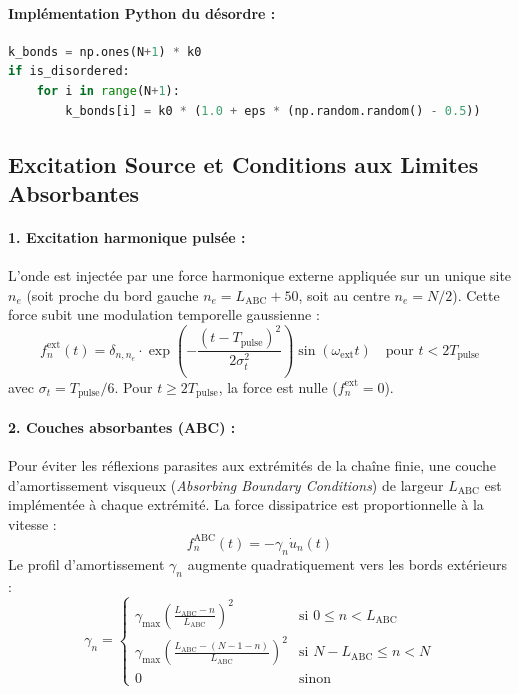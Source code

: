 \documentclass[11pt, a4paper]{report}
\begin{document}
\paragraph{Implémentation Python du désordre :}
\begin{lstlisting}[language=Python]
k_bonds = np.ones(N+1) * k0
if is_disordered:
    for i in range(N+1):
        k_bonds[i] = k0 * (1.0 + eps * (np.random.random() - 0.5))
\end{lstlisting}

\subsection{Excitation Source et Conditions aux Limites Absorbantes}

\paragraph{1. Excitation harmonique pulsée :}
L'onde est injectée par une force harmonique externe appliquée sur un unique site $n_e$ (soit proche du bord gauche $n_e = L_{\text{ABC}} + 50$, soit au centre $n_e = N/2$). Cette force subit une modulation temporelle gaussienne :
\begin{equation}
    f_n^{\text{ext}}(t) = \delta_{n, n_e} \cdot \exp\left(-\frac{(t - T_{\text{pulse}})^2}{2 \sigma_t^2}\right) \sin(\omega_{\text{ext}} t) \quad \text{pour } t < 2 T_{\text{pulse}}
\end{equation}
avec $\sigma_t = T_{\text{pulse}} / 6$. Pour $t \ge 2 T_{\text{pulse}}$, la force est nulle ($f_n^{\text{ext}} = 0$).

\paragraph{2. Couches absorbantes (ABC) :}
Pour éviter les réflexions parasites aux extrémités de la chaîne finie, une couche d'amortissement visqueux (\textit{Absorbing Boundary Conditions}) de largeur $L_{\text{ABC}}$ est implémentée à chaque extrémité. La force dissipatrice est proportionnelle à la vitesse :
\begin{equation}
    f_n^{\text{ABC}}(t) = -\gamma_n \dot{u}_n(t)
\end{equation}
Le profil d'amortissement $\gamma_n$ augmente quadratiquement vers les bords extérieurs :
\begin{equation}
    \gamma_n = \begin{cases}
        \gamma_{\text{max}} \left(\frac{L_{\text{ABC}} - n}{L_{\text{ABC}}}\right)^2 & \text{si } 0 \le n < L_{\text{ABC}} \\
        \gamma_{\text{max}} \left(\frac{L_{\text{ABC}} - (N - 1 - n)}{L_{\text{ABC}}}\right)^2 & \text{si } N - L_{\text{ABC}} \le n < N \\
        0 & \text{sinon}
    \end{cases}
\end{equation}
\end{document}
